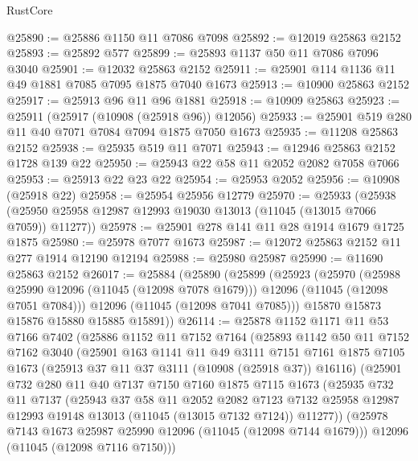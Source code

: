 \begin{lexlean}{RustCore}
\begin{coremodule}
@25890 := @25886 @1150 @11 @7086 @7098
@25892 := @12019 @25863 @2152
@25893 := @25892 @577
@25899 := @25893 @1137 @50 @11 @7086 @7096 @3040
@25901 := @12032 @25863 @2152
@25911 := @25901 @114 @1136 @11 @49 @1881 @7085 @7095 @1875 @7040 @1673
@25913 := @10900 @25863 @2152
@25917 := @25913 @96 @11 @96 @1881
@25918 := @10909 @25863
@25923 := @25911 (@25917 (@10908 (@25918 @96)) @12056)
@25933 := @25901 @519 @280 @11 @40 @7071 @7084 @7094 @1875 @7050 @1673
@25935 := @11208 @25863 @2152
@25938 := @25935 @519 @11 @7071
@25943 := @12946 @25863 @2152 @1728 @139 @22
@25950 := @25943 @22 @58 @11 @2052 @2082 @7058 @7066
@25953 := @25913 @22 @23 @22
@25954 := @25953 @2052
@25956 := @10908 (@25918 @22)
@25958 := @25954 @25956 @12779
@25970 := @25933
    (@25938 (@25950 @25958 @12987 @12993 @19030 @13013 (@11045 (@13015 @7066 @7059)) @11277))
@25978 := @25901 @278 @141 @11 @28 @1914 @1679 @1725 @1875
@25980 := @25978 @7077 @1673
@25987 := @12072 @25863 @2152 @11 @277 @1914 @12190 @12194
@25988 := @25980 @25987
@25990 := @11690 @25863 @2152
@26017 := @25884
    (@25890
      (@25899
        (@25923
          (@25970
            (@25988 @25990 @12096 (@11045 (@12098 @7078 @1679)))
            @12096
            (@11045 (@12098 @7051 @7084)))
          @12096
          (@11045 (@12098 @7041 @7085)))
        @15870
        @15873
        @15876
        @15880
        @15885
        @15891))
@26114 := @25878
    @1152
    @1171
    @11
    @53
    @7166
    @7402
    (@25886
      @1152
      @11
      @7152
      @7164
      (@25893
        @1142
        @50
        @11
        @7152
        @7162
        @3040
        (@25901
          @163
          @1141
          @11
          @49
          @3111
          @7151
          @7161
          @1875
          @7105
          @1673
          (@25913 @37 @11 @37 @3111 (@10908 (@25918 @37)) @16116)
          (@25901
            @732
            @280
            @11
            @40
            @7137
            @7150
            @7160
            @1875
            @7115
            @1673
            (@25935
              @732
              @11
              @7137
              (@25943
                @37
                @58
                @11
                @2052
                @2082
                @7123
                @7132
                @25958
                @12987
                @12993
                @19148
                @13013
                (@11045 (@13015 @7132 @7124))
                @11277))
            (@25978 @7143 @1673 @25987 @25990 @12096 (@11045 (@12098 @7144 @1679)))
            @12096
            (@11045 (@12098 @7116 @7150)))

\end{coremodule}
\end{lexlean}
